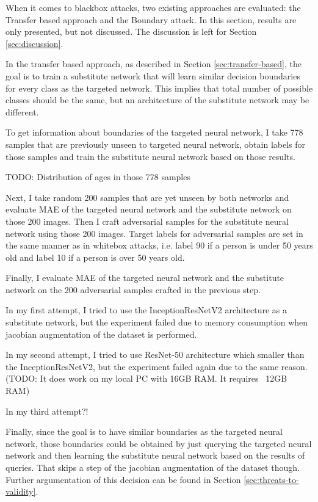 When it comes to blackbox attacks, two existing approaches are evaluated: the Transfer based approach and the Boundary attack. In this section, results are only presented, but not discussed. The discussion is left for Section \ref{sec:discussion}.

In the transfer based approach, as described in Section \ref{sec:transfer-based}, the goal is to train a substitute network that will learn similar decision boundaries for every class as the targeted network. This implies that total number of possible classes should be the same, but an architecture of the substitute network may be different.

To get information about boundaries of the targeted neural network,  I take 778 samples that are previously unseen to targeted neural network, obtain labels for those samples and train the substitute neural network based on those results.

 TODO: Distribution of ages in those 778 samples

Next, I take random 200 samples that are yet unseen by both networks and evaluate MAE of the targeted neural network and the substitute network on those 200 images. Then I craft adversarial samples for the substitute neural network using those 200 images. Target labels for adversarial samples are set in the same manner as in whitebox attacks, i.e. label 90 if a person is under 50 years old and label 10 if a person is over 50 years old. 

Finally, I evaluate MAE of the targeted neural network and the substitute network on the 200 adversarial samples crafted in the previous step.

In my first attempt, I tried to use the InceptionResNetV2 architecture as a substitute network, but the experiment failed due to memory consumption when jacobian augmentation of the dataset is performed. 

In my second attempt, I tried to use ResNet-50 architecture which smaller than the InceptionResNetV2, but the experiment failed again due to the same reason. (TODO: It does work on my local PC with 16GB RAM. It requires ~12GB RAM)

In my third attempt?!

Finally, since the goal is to have similar boundaries as the targeted neural network, those boundaries could be obtained by just querying the targeted neural network and then learning the substitute neural network based on the results of queries. That skips a step of the jacobian augmentation of the dataset though. Further argumentation of this decision can be found in Section \ref{sec:threats-to-validity}.



